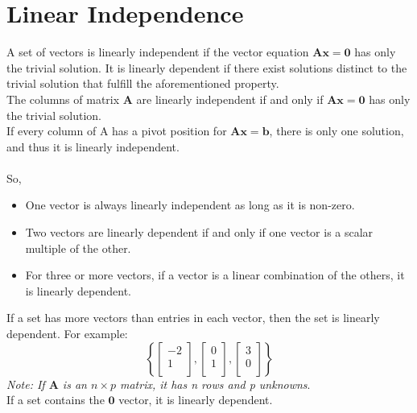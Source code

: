 \documentclass[nobib]{tufte-handout}
\begin{document}
\section{Linear Independence}
A set of vectors is linearly independent if the vector equation $\mathbf{Ax=0}$ has only the trivial solution. It is linearly dependent if there exist solutions distinct to the trivial solution that fulfill the aforementioned property.\\
The columns of matrix $\mathbf{A}$ are linearly independent if and only if $\mathbf{Ax=0}$ has only the trivial solution.\\
If every column of A has a pivot position for $\mathbf{Ax=b}$, there is only one solution, and thus it is linearly independent.\\~\\
So,
\begin{itemize}
    \item One vector is always linearly independent as long as it is non-zero.
    \item Two vectors are linearly dependent if and only if one vector is a scalar multiple of the other.
    \item For three or more vectors, if a vector is a linear combination of the others, it is linearly dependent.
\end{itemize}
If a set has more vectors than entries in each vector, then the set is linearly dependent. For example:
\begin{equation*}
    \left\{
    \begin{bmatrix}
        -2\\ 1 \\
    \end{bmatrix},
    \begin{bmatrix}
        0\\ 1 \\
    \end{bmatrix},
    \begin{bmatrix}
        3\\ 0 \\
    \end{bmatrix}
    \right\}
\end{equation*}
\textit{Note: If $\mathbf{A}$ is an $n \times p$ matrix, it has n rows and p unknowns}.\\
If a set contains the $\mathbf{0}$ vector, it is linearly dependent.\\
\end{document}

